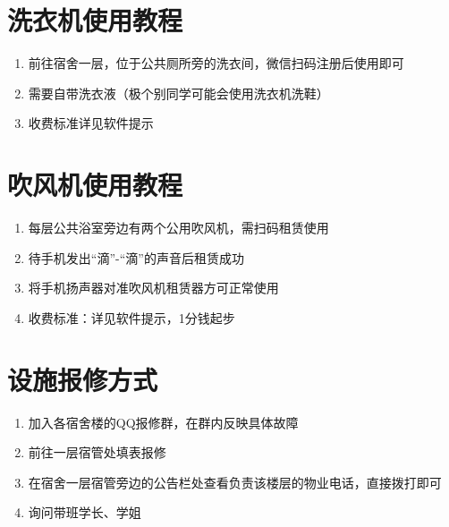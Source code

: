 \section[洗衣机使用教程]{洗衣机使用教程}
\begin{enumerate}
    \item 前往宿舍一层，位于公共厕所旁的洗衣间，微信扫码注册后使用即可
    \item 需要自带洗衣液（极个别同学可能会使用洗衣机洗鞋）
    \item 收费标准详见软件提示
\end{enumerate}

\section[吹风机使用教程]{吹风机使用教程}
\label{dry_machine}
\begin{enumerate}
    \item 每层公共浴室旁边有两个公用吹风机，需扫码\footnotemark 租赁使用
    \item 待手机发出“滴”-“滴”的声音后租赁成功
    \item 将手机扬声器对准吹风机租赁器方可正常使用
    \item 收费标准：详见软件提示，1分钱起步
\end{enumerate}

\section[设施报修方式]{设施报修方式}
\label{repair_report}
\begin{enumerate}
    \item 加入各宿舍楼的QQ报修群，在群内反映具体故障
    \item 前往一层宿管处填表报修
    \item 在宿舍一层宿管旁边的公告栏处查看负责该楼层的物业电话，直接拨打即可
    \item 询问带班学长、学姐
\end{enumerate}

